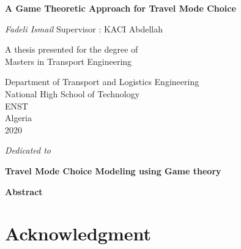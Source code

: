 \documentclass[12pt]{report}
\newenvironment{dedication}
  {\clearpage           %
   \thispagestyle{empty}%
   \vspace*{\stretch{1}}%
   \itshape             %
   \raggedleft          %
  }
  {\par %
   \vspace{\stretch{3}} %
   \clearpage           %
  }
\def\blankpage{%
      \clearpage%
      \thispagestyle{empty}%
      \addtocounter{page}{-1}%
      \null%
      \clearpage}
\begin{document}
\begin{titlepage}

   \begin{center}
   \thisfancypage{%
\setlength{\fboxsep}{10pt}\doublebox}{}
       \vspace*{1cm}
 	   \Huge
       \textbf{A Game Theoretic Approach for Travel Mode Choice}
		\LARGE
		
       \vspace{0.5cm}
        
            
       \vspace{1.5cm}

       \textit{Fadeli Ismail}
\vfill
\normalsize
Supervisor : KACI Abdellah\\

       \vfill
       
            	\normalsize
       A thesis presented for the degree of\\
       Masters in Transport Engineering
            
       \vspace{0.8cm}
     
       
            \Large
       Department of Transport and Logistics Engineering\\
       National High School of Technology \\
       ENST\\
       Algeria\\
       2020
            
   \end{center}
   

\end{titlepage}
\blankpage
\begin{dedication}\thispagestyle{empty}
Dedicated to 
\end{dedication}
\clearpage
\thispagestyle{empty}
\thispagestyle{plain}
\begin{center}
    \Large
    \textbf{Travel Mode Choice Modeling using Game theory}
        
    \vspace{0.4cm}
    \large
   
        
    \vspace{0.4cm}
    
       
    \vspace{0.9cm}
    \textbf{Abstract}
\end{center}

\clearpage
\section*{Acknowledgment}\thispagestyle{empty}
\clearpage
\tableofcontents \thispagestyle{empty}
\listoffigures
\listoftables
{}
\clearpage
\end{document}
